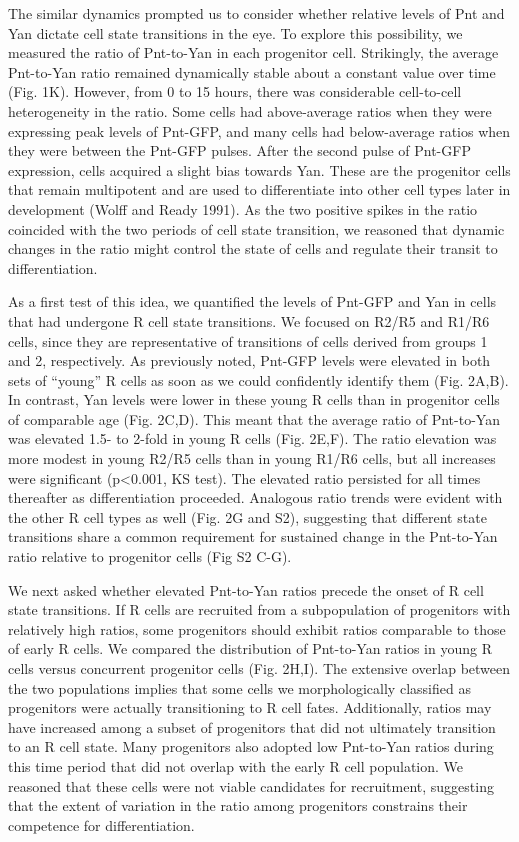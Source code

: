 The similar dynamics prompted us to consider whether relative levels of Pnt and Yan dictate cell state transitions in the eye. To explore this possibility, we measured the ratio of Pnt-to-Yan in each progenitor cell. Strikingly, the average Pnt-to-Yan ratio remained dynamically stable about a constant value over time (Fig. 1K). However, from 0 to 15 hours, there was considerable cell-to-cell heterogeneity in the ratio. Some cells had above-average ratios when they were expressing peak levels of Pnt-GFP, and many cells had below-average ratios when they were between the Pnt-GFP pulses. After the second pulse of Pnt-GFP expression, cells acquired a slight bias towards Yan. These are the progenitor cells that remain multipotent and are used to differentiate into other cell types later in development (Wolff and Ready 1991). As the two positive spikes in the ratio coincided with the two periods of cell state transition, we reasoned that dynamic changes in the ratio might control the state of cells and regulate their transit to differentiation.

As a first test of this idea, we quantified the levels of Pnt-GFP and Yan in cells that had undergone R cell state transitions. We focused on R2/R5 and R1/R6 cells, since they are representative of transitions of cells derived from groups 1 and 2, respectively. As previously noted, Pnt-GFP levels were elevated in both sets of ``young'' R cells as soon as we could confidently identify them (Fig. 2A,B). In contrast, Yan levels were lower in these young R cells than in progenitor cells of comparable age (Fig. 2C,D). This meant that the average ratio of Pnt-to-Yan was elevated 1.5- to 2-fold in young R cells (Fig. 2E,F). The ratio elevation was more modest in young R2/R5 cells than in young R1/R6 cells, but all increases were significant (p\textless{}0.001, KS test). The elevated ratio persisted for all times thereafter as differentiation proceeded. Analogous ratio trends were evident with the other R cell types as well (Fig. 2G and S2), suggesting that different state transitions share a common requirement for sustained change in the Pnt-to-Yan ratio relative to progenitor cells (Fig S2 C-G).

We next asked whether elevated Pnt-to-Yan ratios precede the onset of R cell state transitions. If R cells are recruited from a subpopulation of progenitors with relatively high ratios, some progenitors should exhibit ratios comparable to those of early R cells. We compared the distribution of Pnt-to-Yan ratios in young R cells versus concurrent progenitor cells (Fig. 2H,I). The extensive overlap between the two populations implies that some cells we morphologically classified as progenitors were actually transitioning to R cell fates. Additionally, ratios may have increased among a subset of progenitors that did not ultimately transition to an R cell state. Many progenitors also adopted low Pnt-to-Yan ratios during this time period that did not overlap with the early R cell population. We reasoned that these cells were not viable candidates for recruitment, suggesting that the extent of variation in the ratio among progenitors constrains their competence for differentiation.


